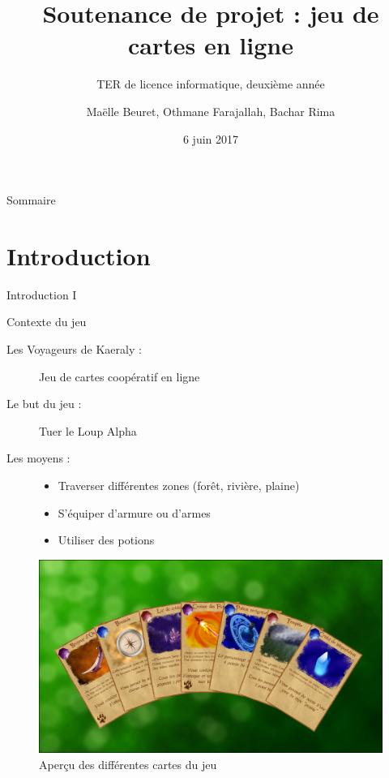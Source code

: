 \documentclass{bredelebeamer}
\title[Jeu de cartes en lignes]{Soutenance de projet : jeu de cartes en ligne}
\subtitle{TER de licence informatique, deuxième année}
\author{Maëlle Beuret, Othmane Farajallah, Bachar Rima}
\institute[UM]
\date{6 juin 2017}
\begin{document}
  \begin{frame}
    \titlepage
  \end{frame}

  \begin{frame}{Sommaire}
    \tableofcontents
  \end{frame}

  \section{Introduction}
  \begin{frame}{Introduction I}
    \begin{block}{Contexte du jeu}
      \begin{description}
        \item [Les Voyageurs de Kaeraly :]{Jeu de cartes coopératif en ligne}
        \pause
        \item [Le but du jeu :]{Tuer le Loup Alpha}
        \pause
        \item [Les moyens : ]{
          \begin{itemize}
            \item {Traverser différentes zones (forêt, rivière, plaine)}
            \pause
            \item {S'équiper d'armure ou d'armes}
            \pause
            \item {Utiliser des potions}
            \pause
          \end{itemize}
        }
      \end{description}
    \end{block}
    
    \begin{figure}[h!]
    	\centering
    	\includegraphics[scale=0.2]{cards.png}
    	\caption{Aperçu des différentes cartes du jeu}
    \end{figure}
\end{frame}
\end{document}
